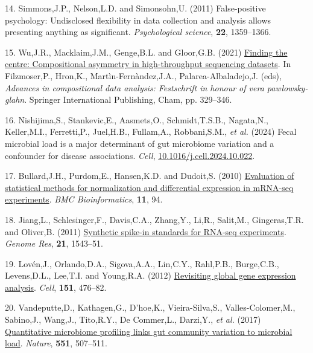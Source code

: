 \documentclass[
]{article}
\newlength{\cslhangindent}
\newenvironment{CSLReferences}[2] %
 {\begin{list}{}{%
  \setlength{\itemindent}{0pt}
  \setlength{\leftmargin}{0pt}
  \setlength{\parsep}{0pt}
  \ifodd #1
   \setlength{\leftmargin}{\cslhangindent}
   \setlength{\itemindent}{-1\cslhangindent}
  \fi
  \setlength{\itemsep}{#2\baselineskip}}}
 {\end{list}}
\begin{document}
\begin{CSLReferences}{1}{1}
14. Simmons,J.P., Nelson,L.D. and Simonsohn,U. (2011) False-positive
psychology: Undisclosed flexibility in data collection and analysis
allows presenting anything as significant. \emph{Psychological science},
\textbf{22}, 1359--1366.

15. Wu,J.R., Macklaim,J.M., Genge,B.L. and Gloor,G.B. (2021)
\href{https://doi.org/10.1007/978-3-030-71175-7_17}{Finding the centre:
Compositional asymmetry in high-throughput sequencing datasets}. In
Filzmoser,P., Hron,K., Martìn-Fernàndez,J.A., Palarea-Albaladejo,J.
(eds), \emph{Advances in compositional data analysis: Festschrift in
honour of vera pawlowsky-glahn}. Springer International Publishing,
Cham, pp. 329--346.

16. Nishijima,S., Stankevic,E., Aasmets,O., Schmidt,T.S.B., Nagata,N.,
Keller,M.I., Ferretti,P., Juel,H.B., Fullam,A., Robbani,S.M., \emph{et
al.} (2024) Fecal microbial load is a major determinant of gut
microbiome variation and a confounder for disease associations.
\emph{Cell},
\href{https://doi.org/10.1016/j.cell.2024.10.022}{10.1016/j.cell.2024.10.022}.

17. Bullard,J.H., Purdom,E., Hansen,K.D. and Dudoit,S. (2010)
\href{https://doi.org/10.1186/1471-2105-11-94}{Evaluation of statistical
methods for normalization and differential expression in m{RNA-seq}
experiments}. \emph{BMC Bioinformatics}, \textbf{11}, 94.

18. Jiang,L., Schlesinger,F., Davis,C.A., Zhang,Y., Li,R., Salit,M.,
Gingeras,T.R. and Oliver,B. (2011)
\href{https://doi.org/10.1101/gr.121095.111}{Synthetic spike-in
standards for RNA-seq experiments}. \emph{Genome Res}, \textbf{21},
1543--51.

19. Lovén,J., Orlando,D.A., Sigova,A.A., Lin,C.Y., Rahl,P.B.,
Burge,C.B., Levens,D.L., Lee,T.I. and Young,R.A. (2012)
\href{https://doi.org/10.1016/j.cell.2012.10.012}{Revisiting global gene
expression analysis}. \emph{Cell}, \textbf{151}, 476--82.

20. Vandeputte,D., Kathagen,G., D'hoe,K., Vieira-Silva,S.,
Valles-Colomer,M., Sabino,J., Wang,J., Tito,R.Y., De Commer,L.,
Darzi,Y., \emph{et al.} (2017)
\href{https://doi.org/10.1038/nature24460}{Quantitative microbiome
profiling links gut community variation to microbial load}.
\emph{Nature}, \textbf{551}, 507--511.


\end{CSLReferences}
\end{document}
